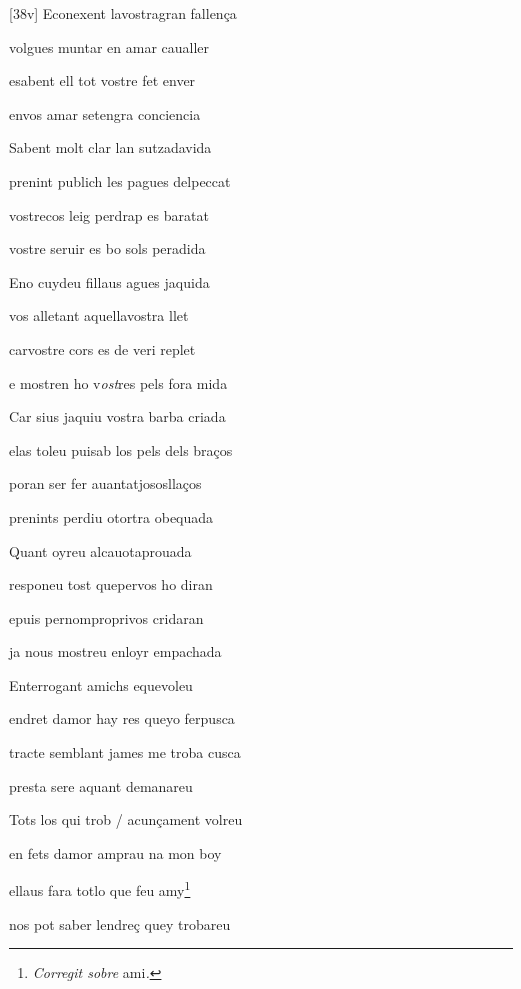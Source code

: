 \documentclass[12pt]{article}
\begin{document}
\begin{estrofa}

 [38v] Econexent lavostragran fallen\c{c}a

 volgues muntar en amar caualler

 esabent ell tot vostre fet enver

 envos amar setengra conciencia

 Sabent molt clar lan sutzadavida

 prenint publich les pagues delpeccat

 vostrecos leig perdrap es baratat

 vostre seruir es bo sols peradida

\end{estrofa}



\begin{estrofa}

 Eno cuydeu fillaus agues jaquida

 vos alletant aquellavostra llet

 carvostre cors es de veri replet

 e mostren ho v\textit{ost}res pels fora mida

 Car sius jaquiu vostra barba criada

 elas toleu puisab los pels dels bra\c{c}os

 poran ser fer auantatjososlla\c{c}os

 prenints perdiu otortra obequada

\end{estrofa}



\begin{estrofa}

 Quant oyreu alcauotaprouada

 responeu tost quepervos ho diran

 epuis pernomproprivos cridaran

 ja nous mostreu enloyr empachada

 Enterrogant amichs equevoleu

 endret damor hay res queyo ferpusca

 tracte semblant james me troba cusca

 presta sere aquant demanareu

\end{estrofa}



\begin{estrofa}

 Tots los qui trob / acun\c{c}ament volreu

 en fets damor amprau na mon boy

 ellaus fara totlo que feu amy\footnote{\textit{Corregit sobre }ami\textit{.}}

 nos pot saber lendre\c{c} quey trobareu

\end{estrofa}
\end{document}
